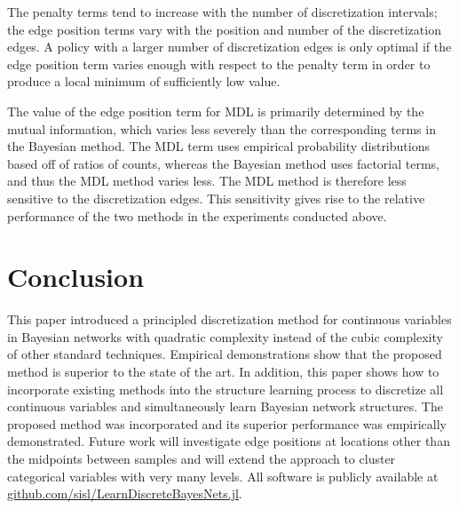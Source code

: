 The penalty terms tend to increase with the number of discretization intervals; the edge position terms vary with the position and number of the discretization edges.
A policy with a larger number of discretization edges is only optimal if the edge position term varies enough with respect to the penalty term in order to produce a local minimum of sufficiently low value.

The value of the edge position term for MDL is primarily determined by the mutual information, which varies less severely than the corresponding terms in the Bayesian method.
The MDL term uses empirical probability distributions based off of ratios of counts, whereas the Bayesian method uses factorial terms, and thus the MDL method varies less.
The MDL method is therefore less sensitive to the discretization edges.
This sensitivity gives rise to the relative performance of the two methods in the experiments conducted above.

\section{Conclusion}
This paper introduced a principled discretization method for continuous variables in Bayesian networks with quadratic complexity instead of the cubic complexity of other standard techniques.
Empirical demonstrations show that the proposed method is superior to the state of the art.
In addition, this paper shows how to incorporate existing methods into the structure learning process to discretize all continuous variables and simultaneously learn Bayesian network structures.
The proposed method was incorporated and its superior performance was empirically demonstrated.
Future work will investigate edge positions at locations other than the midpoints between samples and will extend the approach to cluster categorical variables with very many levels.
All software is publicly available at \url{github.com/sisl/LearnDiscreteBayesNets.jl}.



